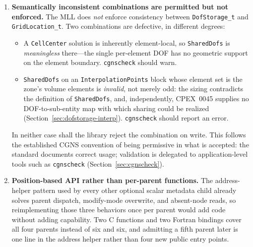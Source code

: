 \documentclass[11pt,letterpaper]{article}
\begin{document}
\begin{enumerate}[leftmargin=2em]
\item \label{dd:permissive} \textbf{Semantically inconsistent
  combinations are permitted but not enforced.}
  The MLL does \emph{not} enforce consistency between
  \texttt{DofStorage\_t} and \texttt{GridLocation\_t}.  Two
  combinations are defective, in different degrees:

  \begin{itemize}[leftmargin=1.5em]
  \item A \texttt{CellCenter} solution is inherently element-local, so
    \texttt{SharedDofs} is \emph{meaningless} there---the single
    per-element DOF has no geometric support on the element boundary.
    \texttt{cgnscheck} should warn.
  \item \texttt{SharedDofs} on an \texttt{InterpolationPoints} block whose
    element set is the zone's volume elements is \emph{invalid}, not
    merely odd: the sizing contradicts the definition of
    \texttt{SharedDofs}, and, independently, CPEX~0045 supplies no
    DOF-to-sub-entity map with which sharing could be realized
    (Section~\ref{sec:dofstorage-interp}).  \texttt{cgnscheck} should
    report an error.
  \end{itemize}

  In neither case shall the library reject the combination on write.
  This follows the established
  CGNS convention of being permissive in what is accepted: the
  standard documents correct usage; validation is delegated to
  application-level tools such as \texttt{cgnscheck}
  (Section~\ref{sec:cgnscheck}).

\item \label{dd:api} \textbf{Position-based API rather than per-parent
  functions.}  The address-helper pattern used by every other optional
  scalar metadata child already solves parent dispatch, modify-mode
  overwrite, and absent-node reads, so reimplementing those three
  behaviors once per parent would add code without adding capability.
  Two C functions and two Fortran bindings cover all four parents
  instead of six and six, and admitting a fifth parent later is one line
  in the address helper rather than four new public entry points.


\end{enumerate}
\end{document}
